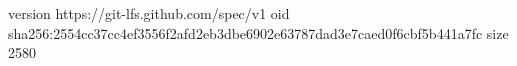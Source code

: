 version https://git-lfs.github.com/spec/v1
oid sha256:2554cc37cc4ef3556f2afd2eb3dbe6902e63787dad3e7caed0f6cbf5b441a7fc
size 2580
